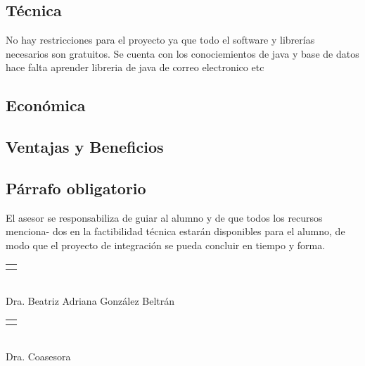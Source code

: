 \subsection*{Técnica}
No hay restricciones para el proyecto ya que todo el software y librerías necesarios son gratuitos.
Se cuenta con los conociemientos de java y base de datos 
hace falta aprender libreria de java de correo electronico etc

\subsection*{Económica}


\subsection*{Ventajas y Beneficios}


\subsection*{Párrafo obligatorio}
El asesor se responsabiliza de guiar al alumno y de que todos los recursos menciona-
dos en la factibilidad técnica estarán disponibles para el alumno, de modo que el proyecto
de integración se pueda concluir en tiempo y forma.

\begin{center}
	\begin{minipage}{0.4\textwidth}
		\centering
		\begin{tabular}{l}
			\makebox[5cm]{\hrulefill}
		\end{tabular}\\
		Dra. Beatriz Adriana González Beltrán%
	\end{minipage}
	\begin{minipage}{0.4\textwidth}
		\centering
		\begin{tabular}{l}
			\makebox[5cm]{\hrulefill}
		\end{tabular}\\
		Dra. Coasesora%
	\end{minipage}
\end{center}

